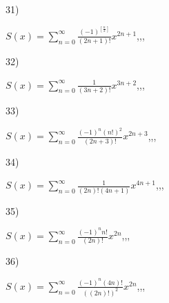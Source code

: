 \documentclass[11pt, ukrainian]{article}
\begin{document}
\par
\newpage
31) \space 
{%
{$S(x)=\sum\limits_{n=0}^{\infty}{\frac{(-1)^{[\frac{n}{2}]}}{(2n+1)!}}{x^{{2n+1}}}$},,, \par \smallskip  
}
\par
\vspace{0.9cm}
32) \space 
{%
{$S(x)=\sum\limits_{n=0}^{\infty}{\frac{1}{(3n+2)!}}{x^{{3n+2}}}$},,, \par \smallskip  
}
\par
\vspace{0.9cm}
33) \space 
{%
{$S(x)=\sum\limits_{n=0}^{\infty}{\frac{{(-1)^n}{(n!)^2}}{(2n+3)!}}{x^{{2n+3}}}$},,, \par \smallskip  
}
\par
\vspace{0.9cm}
34) \space 
{%
{$S(x)=\sum\limits_{n=0}^{\infty}{\frac{1}{(2n)!(4n+1)}}{x^{{4n+1}}}$},,, \par \smallskip  
}
\par
\vspace{0.9cm}
35) \space 
{%
{$S(x)=\sum\limits_{n=0}^{\infty}{\frac{{(-1)^n}{n!}}{(2n)!}}{x^{{2n}}}$},,, \par \smallskip  
}
\par
\vspace{0.9cm}
36) \space 
{%
{$S(x)=\sum\limits_{n=0}^{\infty}{\frac{{(-1)^n}(4n)!}{{((2n)!)^2}}}{x^{{2n}}}$},,, \par \smallskip  
}
\end{document}
